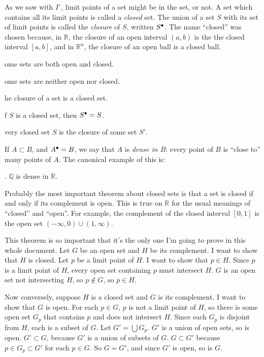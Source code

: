 \documentclass{article}
\def\R{{\mathbb R}}
\def\Rn{{\R^n}}
\newcounter{exercisecounter}\setcounter{exercisecounter}{1}
\def\Exercise.#1\par{{\item\small {\bf Exercise \number\theexercisecounter}.#1\addtocounter{exercisecounter}{1}}}
\def\clos#1{\smash{#1}^\bullet\vphantom{#1}}
\begin{document}
As we saw with $I^\circ$, limit points of a set might be in the set,
or not.  A set which contains all its limit points is called a {\em
  closed\/} set.  The union of a set $S$ with its set of limit points
is called the {\em closure\/} of $S$, written $\clos S$.  The name
``closed'' was chosen because, in $\R$, the closure of an open interval
$(a, b)$ is the the closed interval $[a, b]$, and in $\Rn$, the closure of
an open ball is a closed ball.

\begin{itemize}
\Exercise. Some sets are both open and closed.

\Exercise. Some sets are neither open nor closed.

\Exercise. The closure of a set is a closed set.

\Exercise. if $S$ is a closed set, then $\clos S = S$.

\Exercise. Every closed set $S$ is the closure of some set $S'$. 

\end{itemize}

If $A\subset B$, and $\clos A = B$, we say that
$A$ is {\em dense in $B$}: every point of $B$ is ``close to'' many
points of  $A$.  The canonical example of this is:

\begin{itemize}
\Exercise. $\mathbb Q$ is dense in $\R$.

\end{itemize}

Probably the most important theorem about closed sets is that a set is
closed if and only if its complement is open.    This is
true on $\R$ for the usual meanings of ``closed'' and ``open''.  For
example, the complement of the closed interval $[0, 1]$ is the open
set $(-\infty, 0) \cup (1, \infty)$.

This theorem is so important that it's the only one I'm going to prove
in this whole document.  Let $G$ be an open set and $H$ be its
complement.  I want to show that $H$ is closed.  Let $p$ be a limit
point of $H$.  I want to show that $p\in H$.  Since $p$ is a limit
point of $H$, every open set containing $p$ must intersect $H$.  $G$
is an open set not intersecting $H$, so $p\not\in G$, so $p\in H$.

Now conversely, suppose $H$ is a closed set and $G$ is its
complement.  I want to show that $G$ is open.  For each $p\in G$, $p$
is not a limit point of $H$, so there is some open set $G_p$ that
contains $p$ and does not intersect $H$.  Since each $G_p$ is disjoint
from $H$, each is a subset of $G$.   Let $G'=\bigcup G_p$.  $G'$ is a
union of open sets, so is open.
$G'\subset G$, because $G'$ is a union of subsets of $G$.  
$G\subset G'$ because $p\in G_p\subset G'$ for each $p\in G$.
So $G=G'$, and since $G'$ is open, so is $G$.
\end{document}
